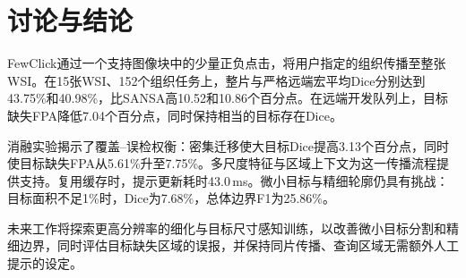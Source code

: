 \section{讨论与结论}
FewClick通过一个支持图像块中的少量正负点击，将用户指定的组织传播至整张WSI。在15张WSI、152个组织任务上，整片与严格远端宏平均Dice分别达到43.75\%和40.98\%，比SANSA高10.52和10.86个百分点。在远端开发队列上，目标缺失FPA降低7.04个百分点，同时保持相当的目标存在Dice。

消融实验揭示了覆盖–误检权衡：密集迁移使大目标Dice提高3.13个百分点，同时使目标缺失FPA从5.61\%升至7.75\%。多尺度特征与区域上下文为这一传播流程提供支持。复用缓存时，提示更新耗时43.0\,ms。微小目标与精细轮廓仍具有挑战：目标面积不足1\%时，Dice为7.68\%，总体边界F1为25.86\%。

未来工作将探索更高分辨率的细化与目标尺寸感知训练，以改善微小目标分割和精细边界，同时评估目标缺失区域的误报，并保持同片传播、查询区域无需额外人工提示的设定。
